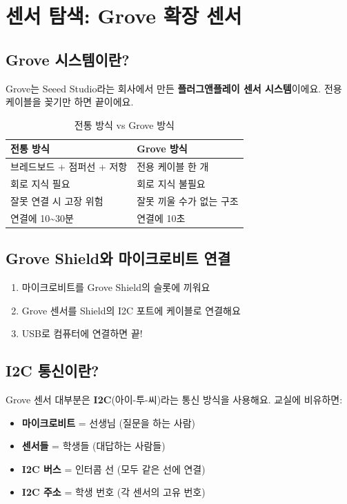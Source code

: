 \documentclass[11pt, a4paper]{article}
\begin{document}
\section{센서 탐색: Grove 확장 센서}

\subsection{Grove 시스템이란?}

Grove는 Seeed Studio라는 회사에서 만든 \textbf{플러그앤플레이 센서 시스템}이에요. 전용 케이블을 꽂기만 하면 끝이에요.

\begin{table}[H]\centering
\caption{전통 방식 vs Grove 방식}
\begin{tabular}{ll}\toprule
\textbf{전통 방식} & \textbf{Grove 방식} \\\midrule
브레드보드 + 점퍼선 + 저항 & 전용 케이블 한 개 \\
회로 지식 필요 & 회로 지식 불필요 \\
잘못 연결 시 고장 위험 & 잘못 끼울 수가 없는 구조 \\
연결에 10\textasciitilde30분 & 연결에 10초 \\
\bottomrule
\end{tabular}
\end{table}

\subsection{Grove Shield와 마이크로비트 연결}

\begin{enumerate}[leftmargin=1.5em]
\item 마이크로비트를 Grove Shield의 슬롯에 끼워요
\item Grove 센서를 Shield의 I2C 포트에 케이블로 연결해요
\item USB로 컴퓨터에 연결하면 끝!
\end{enumerate}

\subsection{I2C 통신이란?}

Grove 센서 대부분은 \textbf{I2C}(아이-투-씨)라는 통신 방식을 사용해요. 교실에 비유하면:

\begin{itemize}[leftmargin=1.5em]
\item \textbf{마이크로비트} = 선생님 (질문을 하는 사람)
\item \textbf{센서들} = 학생들 (대답하는 사람들)
\item \textbf{I2C 버스} = 인터콤 선 (모두 같은 선에 연결)
\item \textbf{I2C 주소} = 학생 번호 (각 센서의 고유 번호)
\end{itemize}
\end{document}
